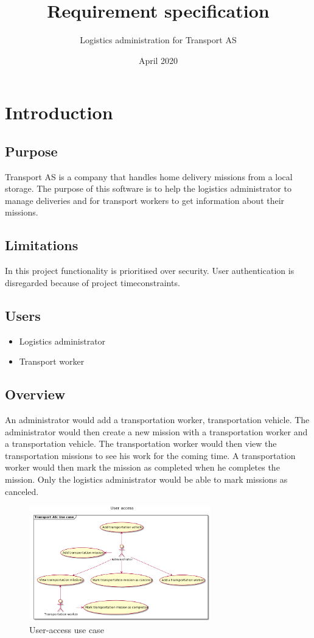 \documentclass[a4paper, 12pt]{article}
\title{Requirement specification}
\author{Logistics administration for Transport AS}
\date{April 2020}
\begin{document}
\maketitle

\section{Introduction}
\subsection{Purpose}
Transport AS is a company that handles home delivery missions from a local storage. The purpose of this software is to help the logistics administrator to manage deliveries and for transport workers to get information about their missions.
\subsection{Limitations}
In this project functionality is prioritised over security.
User authentication is disregarded because of project timeconstraints.

\subsection{Users}
\begin{itemize}
     \item Logistics administrator
     \item Transport worker
\end{itemize}
\subsection{Overview}
An administrator would add a transportation worker, transportation vehicle. The administrator would then create a new mission with a transportation worker and a transportation vehicle. The transportation worker would then view the transportation missions to see his work for the coming time. A transportation worker would then mark the mission as completed when he completes the mission. Only the logistics administrator would be able to mark missions as canceled.
 \begin{figure}[h]
    \centering 
    \includegraphics[width=0.7\textwidth]
    {img/user-access-uc}
    \caption{User-access use case}
    \label{fig:ua-uc}
  \end{figure}
  
\end{document}
